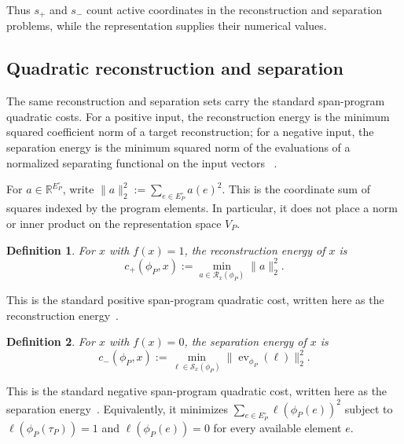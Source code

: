 \documentclass[11pt]{article}
\numberwithin{equation}{section}
\newtheorem{definition}{Definition}[section]
\theoremstyle{remark}
\begin{document}
Thus $s_+$ and $s_-$ count active coordinates in the reconstruction and separation problems, while the representation supplies their numerical values.


\subsection{Quadratic reconstruction and separation}
\label{subsec:quadratic-reconstruction-separation}

The same reconstruction and separation sets carry the standard span-program
quadratic costs. For a positive input, the reconstruction energy is the
minimum squared coefficient norm of a target reconstruction; for a negative
input, the separation energy is the minimum squared norm of the evaluations
of a normalized separating functional on the input vectors
~\cite{ReichardtSpalek2008,Reichardt2009}.

For $a\in\mathbb R^{E_P^\circ}$, write
$\|a\|_2^2:=\sum_{e\in E_P^\circ}a(e)^2$. This is the coordinate
sum of squares indexed by the program elements. In particular, it does not
place a norm or inner product on the representation space $V_P$.

\begin{definition}
\label{def:positive-reconstruction-energy}
For $x$ with $f(x)=1$, the \emph{reconstruction energy} of $x$ is
\begin{equation}
    c_+(\phi_P,x)
    :=
    \min_{a\in\mathcal R_x(\phi_P)}
        \|a\|_2^2.
\end{equation}
\end{definition}

This is the standard positive span-program quadratic cost, written here as
the reconstruction energy~\cite{ReichardtSpalek2008,Reichardt2009}.

\begin{definition}
\label{def:negative-separation-energy}
For $x$ with $f(x)=0$, the \emph{separation energy} of $x$ is
\begin{equation}
    c_-(\phi_P,x)
    :=
    \min_{\ell\in\mathcal S_x(\phi_P)}
        \|\operatorname{ev}_{\phi_P}(\ell)\|_2^2.
\end{equation}
\end{definition}

This is the standard negative span-program quadratic cost, written here as
the separation energy~\cite{ReichardtSpalek2008,Reichardt2009}. Equivalently,
it minimizes $\sum_{e\in E_P^\circ}\ell(\phi_P(e))^2$ subject to
$\ell(\phi_P(\tau_P))=1$ and $\ell(\phi_P(e))=0$ for every available
element $e$.
\end{document}
